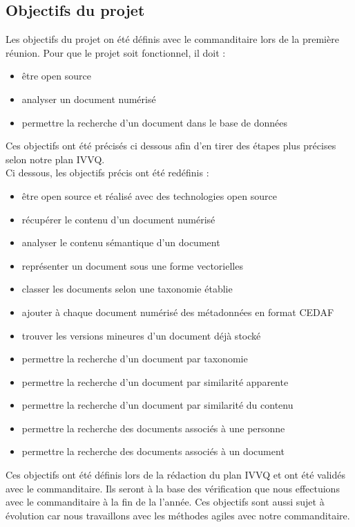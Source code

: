 

\subsection {Objectifs du projet}

Les objectifs du projet on été définis avec le commanditaire lors de la première réunion.
Pour que le projet soit fonctionnel, il doit :
\begin {itemize}
\item être open source
\item analyser un document numérisé
\item permettre la recherche d'un document dans le base de données
\newline
\end {itemize}
Ces objectifs ont été précisés ci dessous afin d'en tirer des étapes plus précises selon notre plan IVVQ. \\ 

Ci dessous, les objectifs précis ont été redéfinis :
\begin {itemize}
\item être open source et réalisé avec des technologies open source
\item récupérer le contenu d’un document numérisé
\item analyser le contenu sémantique d’un document
\item représenter un document sous une forme vectorielles
\item classer les documents selon une taxonomie établie
\item ajouter à chaque document numérisé des métadonnées en format CEDAF
\item trouver les versions mineures d’un document déjà stocké
\item permettre la recherche d’un document par taxonomie
\item permettre la recherche d’un document par similarité apparente
\item permettre la recherche d’un document par similarité du contenu
\item permettre la recherche des documents associés à une personne
\item permettre la recherche des documents associés à un document
\end {itemize}

Ces objectifs ont été définis lors de la rédaction du plan IVVQ et ont été validés avec le commanditaire.
Ils seront à la base des vérification que nous effectuions avec le commanditaire à la fin de la l'année.
Ces objectifs sont aussi sujet à évolution car nous travaillons avec les méthodes agiles avec notre commanditaire.


